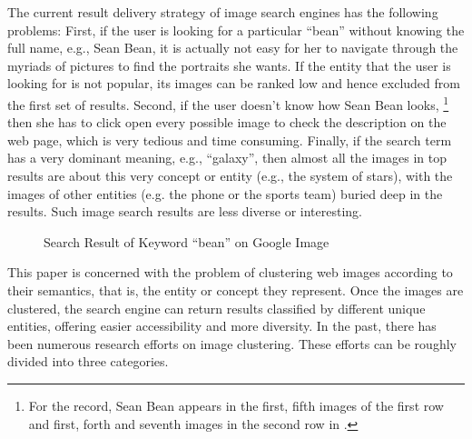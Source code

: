 The current result delivery strategy of image search engines has 
the following problems:
First, if the user is looking for a particular ``bean'' without knowing the
full name, e.g., Sean Bean, it is actually not easy for her to
navigate through the myriads of pictures to find the portraits she wants.
If the entity that the user is looking for is not popular, its images
can be ranked low and hence excluded from the first set of results.
Second, if the user doesn't know how Sean Bean looks,
\footnote{For the record, Sean Bean appears in the first, fifth images
of the first row and first, forth and seventh images in the second row
in .} then
she has to click open every possible image to check the description on
the web page, which is very tedious and time consuming.
Finally, if the search term has a very dominant meaning, e.g.,
``galaxy'', then almost all the images in top results
are about this very concept or entity (e.g., the system of stars),
with the images of other entities (e.g. the phone or the sports team)
buried deep in the results. Such image search results
are less diverse or interesting.

\begin{figure}[th]
	\centerline{}
	\caption{Search Result of Keyword ``bean'' on Google Image}
	\label{fig:search-bean-on-google}
\end{figure}


This paper is concerned with the problem of clustering web images
according to their semantics, that is, the entity or concept they
represent. Once the images are clustered, the search engine can
return results classified by different unique entities,
offering easier accessibility and more diversity.
In the past, there has been numerous research efforts on image clustering. These
efforts can be roughly divided into three categories.

